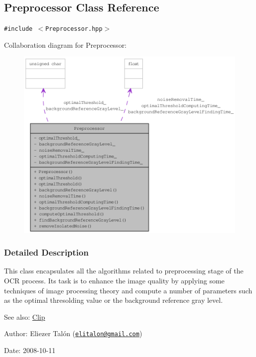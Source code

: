 \hypertarget{class_preprocessor}{
\subsection{Preprocessor Class Reference}
\label{class_preprocessor}
}
{\tt \#include $<$Preprocessor.hpp$>$}

Collaboration diagram for Preprocessor:\nopagebreak
\begin{figure}[H]
\begin{center}
\leavevmode
\includegraphics[width=400pt]{class_preprocessor__coll__graph}
\end{center}
\end{figure}


\subsubsection{Detailed Description}
This class encapsulates all the algorithms related to preprocessing stage of the OCR process. Its task is to enhance the image quality by applying some techniques of image processing theory and compute a number of parameters such as the optimal thresolding value or the background reference gray level.

\begin{Desc}
\item[See also:]\hyperlink{class_clip}{Clip}\end{Desc}
\begin{Desc}
\item[Author:]Eliezer Talón (\href{mailto:elitalon@gmail.com}{\tt elitalon@gmail.com}) \end{Desc}
\begin{Desc}
\item[Date:]2008-10-11 \end{Desc}
